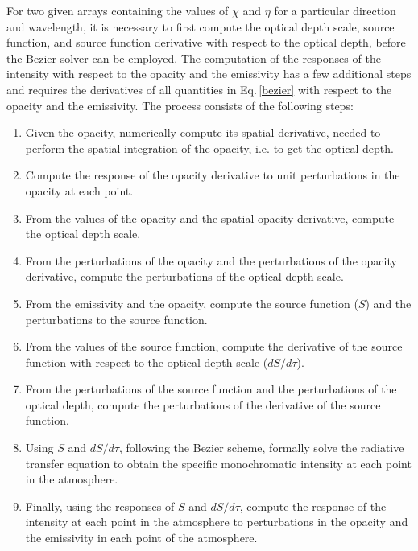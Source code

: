 \documentclass[referee]{aa}
\begin{document}
For two given arrays containing the values of $\chi$ and $\eta$ for a particular direction and wavelength, it is necessary to first compute the optical depth scale, source function, and source function derivative with respect to the optical depth, before the Bezier solver can be employed. The computation of the responses of the intensity with respect to the opacity and the emissivity has a few additional steps and requires the derivatives of all quantities in Eq.\,\ref{bezier} with respect to the opacity and the emissivity. The process consists of the following steps:
\begin{enumerate}
 \item Given the opacity, numerically compute its spatial derivative, needed to perform the spatial integration of the opacity, i.e. to get the optical depth.
 \item Compute the response of the opacity derivative to unit perturbations in the opacity at each point.
 \item From the values of the opacity and the spatial opacity derivative, compute the optical depth scale. 
 \item From the perturbations of the opacity and the perturbations of the opacity derivative, compute the perturbations of the optical depth scale. 
 \item From the emissivity and the opacity, compute the source function ($S$) and the perturbations to the source function.
 \item From the values of the source function, compute the derivative of the source function with respect to the optical depth scale ($dS/d\tau$).
 \item From the perturbations of the source function and the perturbations of the optical depth, compute the perturbations of the derivative of the source function.
 \item Using $S$ and $dS/d\tau$, following the Bezier scheme, formally solve the radiative transfer equation to obtain the specific monochromatic intensity at each point in the atmosphere.
 \item Finally, using the responses of $S$ and $dS/d\tau$, compute the response of the intensity at each point in the atmosphere to perturbations in the opacity and the emissivity in each point of the atmosphere. 
\end{enumerate}
\end{document}

